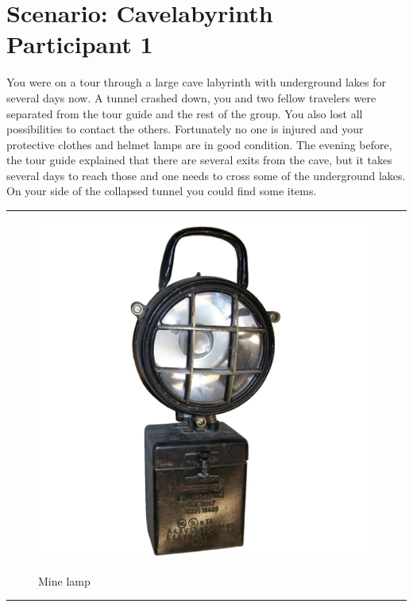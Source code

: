 \documentclass{article}
\begin{document}
    \section*{Scenario: \textmd{Cavelabyrinth} \hfill Participant \textmd{1}}
    \Large You were on a tour through a large cave labyrinth with underground lakes for several days now. A tunnel crashed down, you and two fellow travelers were separated from the tour guide and the rest of the group. You also lost all possibilities to contact the others. Fortunately no one is injured and your protective clothes and helmet lamps are in good condition. The evening before, the tour guide explained that there are several exits from the cave, but it takes several days to reach those and one needs to cross some of the underground lakes. On your side of the collapsed tunnel you could find some items.\clearpage
        \par\noindent\rule{\textwidth}{0.4pt}
    \begin{figure}[H]
        \centering
        \begin{minipage}{0.25\textwidth}
            \centering
            \includegraphics[width=\textwidth]{../SurvivalItemImages/minelamp}
        \end{minipage}\hfill
        \begin{minipage}{0.7\textwidth}
            \centering
            \Large Mine lamp
        \end{minipage}
    \end{figure}
    \vspace{-0.8em}
    \noindent\rule{\textwidth}{0.4pt}
            
\end{document}
